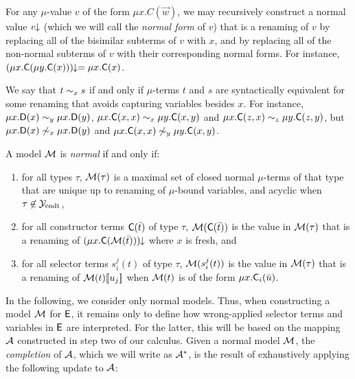 For any $\mu$-value $v$ of the form $\mu x. C( \vec w )$, we may recursively construct a normal value ${v}\!\!\downarrow$
(which we will call the \emph{normal form} of $v$)
that is a renaming of $v$ by replacing all of the bisimilar subterms of $v$ with $x$,
and by replacing all of the non-normal subterms of $v$ with their corresponding normal forms.
For instance, ${(\mu x. \textsf{C}( \mu y. \textsf{C}( x ) ))}\!\!\downarrow = \mu x. \textsf{C}( x )$.

We say that $t \sim_{x} s$ if and only if $\mu$-terms $t$ and $s$ are syntactically equivalent
for some renaming that avoids capturing variables besides $x$.
For instance, 
$\mu x. \textsf{D}( x ) \sim_{y} \mu x. \textsf{D}( y )$,
$\mu x. \textsf{C}( x, x ) \sim_{x} \mu y. \textsf{C}( x, y )$ and
$\mu x. \textsf{C}( z, x ) \sim_{z} \mu y. \textsf{C}( z, y )$,
but
$\mu x. \textsf{D}( x ) \not\sim_{x} \mu x. \textsf{D}( y )$ and
$\mu x. \textsf{C}( x, x ) \not\sim_{y} \mu y. \textsf{C}( x, y )$.



\begin{definition} \label{def:norm-model}
A model $\mathcal{M}$ is \emph{normal} if and only if:
\begin{enumerate}
\item 
for all types $\tau$, 
$\mathcal{M}( \tau )$ is a maximal set of closed normal $\mu$-terms of that type that are 
unique up to renaming of $\mu$-bound variables,
and acyclic when $\tau \not\in \mathcal{Y}_{\mathrm{codt}}$,
\item 
for all constructor terms $\textsf{C}( \bar t )$ of type $\tau$,
$\mathcal{M}( \textsf{C}( \bar t ) )$ is the value 
in $\mathcal{M}( \tau )$ that is a renaming of 
${(\mu x. \textsf{C}( \mathcal{M}( \bar t ) ))}\!\!\downarrow$ where $x$ is fresh, and
\item 
for all selector terms $s^j_i( t )$ of type $\tau$,%
$\mathcal{M}( s^j_i( t ) )$ is the value
in $\mathcal{M}( \tau )$ that is a renaming of 
$\mathcal{M}( t )[\![ u_j ]\!]$
when $\mathcal{M}( t )$ is of the form $\mu x. \textsf{C}_i( \bar u )$.
\end{enumerate}
\end{definition}

In the following, we consider only normal models.
Thus, when constructing a model $\mathcal{M}$ for $\mathsf{E}$,
it remains only to define how wrong-applied selector terms and variables in $\mathsf{E}$ are interpreted.
For the latter, this will be based on the mapping $\mathcal{A}$ constructed in step two of our calculus.
Given a normal model $\mathcal{M}$, the \emph{completion} of $\mathcal{A}$, which we will write as $\mathcal{A}^\ast$, 
is the result of exhaustively applying the following update to $\mathcal{A}$:

